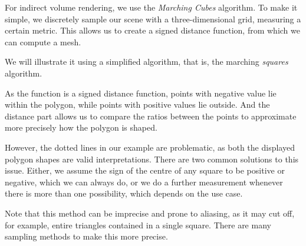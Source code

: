 \documentclass{panikzettel}
\begin{document}
\begin{halfboxl}
For indirect volume rendering, we use the \emph{Marching Cubes} algorithm. To make it simple, we discretely sample our scene with a three-dimensional grid, measuring a certain metric. This allows us to create a signed distance function, from which we can compute a mesh.

We will illustrate it using a simplified algorithm, that is, the marching \emph{squares} algorithm.

As the function is a signed distance function, points with negative value lie within the polygon, while points with positive values lie outside. And the distance part allows us to compare the ratios between the points to approximate more precisely how the polygon is shaped.

However, the dotted lines in our example are problematic, as both the displayed polygon shapes are valid interpretations. There are two common solutions to this issue. Either, we assume the sign of the centre of any square to be positive or negative, which we can always do, or we do a further measurement whenever there is more than one possibility, which depends on the use case.

Note that this method can be imprecise and prone to aliasing, as it may cut off, for example, entire triangles contained in a single square. There are many sampling methods to make this more precise.
\end{halfboxl}%
\end{document}
